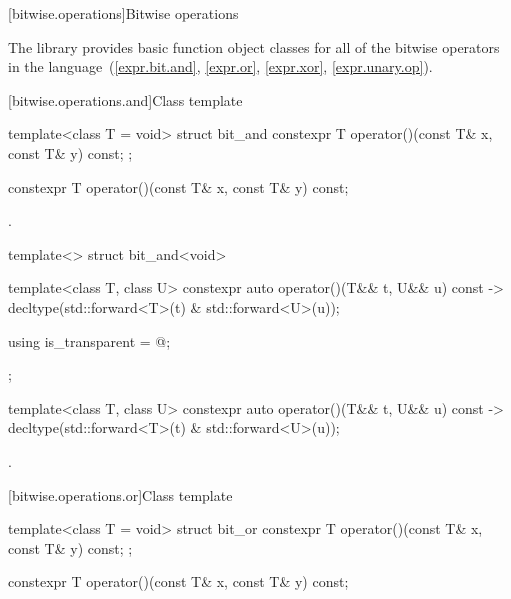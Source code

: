 [bitwise.operations]{Bitwise operations}

\pnum
The library provides basic function object classes for all of the bitwise
operators in the language~(\ref{expr.bit.and}, \ref{expr.or},
\ref{expr.xor}, \ref{expr.unary.op}).

[bitwise.operations.and]{Class template }

%
\begin{itemdecl}
template<class T = void> struct bit_and {
  constexpr T operator()(const T& x, const T& y) const;
};
\end{itemdecl}

%
\begin{itemdecl}
constexpr T operator()(const T& x, const T& y) const;
\end{itemdecl}

\begin{itemdescr}
\pnum\returns {}.
\end{itemdescr}

%
\begin{itemdecl}
template<> struct bit_and<void> {
  template<class T, class U> constexpr auto operator()(T&& t, U&& u) const
    -> decltype(std::forward<T>(t) & std::forward<U>(u));

  using is_transparent = @\unspec@;
};
\end{itemdecl}

%
\begin{itemdecl}
template<class T, class U> constexpr auto operator()(T&& t, U&& u) const
    -> decltype(std::forward<T>(t) & std::forward<U>(u));
\end{itemdecl}

\begin{itemdescr}
\pnum\returns {}.
\end{itemdescr}

[bitwise.operations.or]{Class template }

%
\begin{itemdecl}
template<class T = void> struct bit_or {
  constexpr T operator()(const T& x, const T& y) const;
};
\end{itemdecl}

%
\begin{itemdecl}
constexpr T operator()(const T& x, const T& y) const;
\end{itemdecl}

